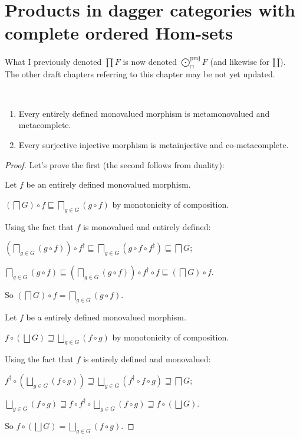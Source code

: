\chapter{Products in dagger categories with complete ordered Hom-sets}


\begin{note}
  What I previously denoted $\prod F$ is now denoted $\bigodot^{\text{proj}}_{\sqcap} F$ (and
  likewise for $\mathord{\coprod}$). The other draft chapters referring to
  this chapter may be not yet updated.
\end{note}

\begin{prop}
  ~
  \begin{enumerate}
    \item Every entirely defined monovalued morphism is metamonovalued and metacomplete.
    \item Every surjective injective morphism is metainjective and co-metacomplete.
  \end{enumerate}

\end{prop}

\begin{proof}
Let's prove the first (the second follows from duality):
  
Let $f$ be an entirely defined monovalued morphism.

$\left( \bigsqcap G \right) \circ f \sqsubseteq \bigsqcap_{g \in G} (g \circ
f)$ by monotonicity of composition.

Using the fact that $f$ is monovalued and entirely defined:

$\left( \bigsqcap_{g \in G} (g \circ f) \right) \circ f^{\dagger} \sqsubseteq
\bigsqcap_{g \in G} (g \circ f \circ f^{\dagger}) \sqsubseteq \bigsqcap G$;

$\bigsqcap_{g \in G} (g \circ f) \sqsubseteq \left( \bigsqcap_{g \in G} (g
\circ f) \right) \circ f^{\dagger} \circ f \sqsubseteq \left( \bigsqcap G
\right) \circ f$.

So $\left( \bigsqcap G \right) \circ f = \bigsqcap_{g \in G} (g \circ f)$.

Let $f$ be a entirely defined monovalued morphism.

$f \circ \left( \bigsqcup G \right) \sqsupseteq \bigsqcup_{g \in G} (f \circ
g)$ by monotonicity of composition.

Using the fact that $f$ is entirely defined and monovalued:

$f^{\dagger} \circ \left( \bigsqcup_{g \in G} (f \circ g) \right) \sqsupseteq
\bigsqcup_{g \in G} (f^{\dagger} \circ f \circ g) \sqsupseteq \bigsqcap G$;

$\bigsqcup_{g \in G} (f \circ g) \sqsupseteq f \circ f^{\dagger} \circ
\bigsqcup_{g \in G} (f \circ g) \sqsupseteq f \circ \left( \bigsqcup G
\right)$.

So $f \circ \left( \bigsqcup G \right) = \bigsqcup_{g \in G} (f \circ g)$.
\end{proof}


